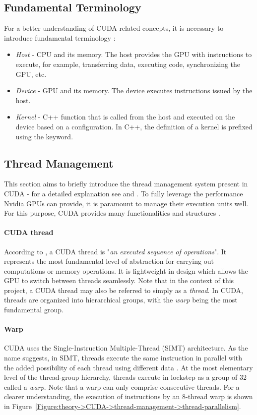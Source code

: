 \subsection{Fundamental Terminology}
For a better understanding of CUDA-related concepts, it is necessary to introduce fundamental terminology \cite{Ruetsch2008, Cejka2022}:
\begin{itemize}
	\item \textit{Host} - CPU and its memory.
The host provides the GPU with instructions to execute, for example, transferring data, executing code, synchronizing the GPU, etc.
	\item \textit{Device} - GPU and its memory.
The device executes instructions issued by the host.
	\item \textit{Kernel} - C++ function that is called from the host and executed on the device based on a configuration.
In C++, the definition of a kernel is prefixed using the  keyword.
\end{itemize}


\subsection{Thread Management}\label{Subsection:theory->CUDA->thread-management}
This section aims to briefly introduce the thread management system present in CUDA - for a detailed explanation see  \cite{Cejka2020} and  \cite{Cejka2022}.
To fully leverage the performance Nvidia GPUs can provide, it is paramount to manage their execution units well.
For this purpose, CUDA provides many functionalities and structures \cite{NVIDIADecember2022}.

\paragraph{CUDA thread} According to  \cite{NVIDIADecember2022}, a CUDA thread is "\textit{an executed sequence of operations}".
It represents the most fundamental level of abstraction for carrying out computations or memory operations.
It is lightweight in design which allows the GPU to switch between threads seamlessly.
Note that in the context of this project, a CUDA thread may also be referred to simply as a \textit{thread}.
In CUDA, threads are organized into hierarchical groups, with the \textit{warp} being the most fundamental group.

\paragraph{Warp} CUDA uses the Single-Instruction Multiple-Thread (SIMT) architecture.
As the name suggests, in SIMT, threads execute the same instruction in parallel with the added possibility of each thread using different data \cite{xtprZzsTAPjyCsGX}.
At the most elementary level of the thread-group hierarchy, threads execute in lockstep as a group of 32 called a \textit{warp}.
Note that a warp can only comprise consecutive threads.
For a clearer understanding, the execution of instructions by an 8-thread warp is shown in Figure~\ref{Figure:theory->CUDA->thread-management->thread-parallelism}.

